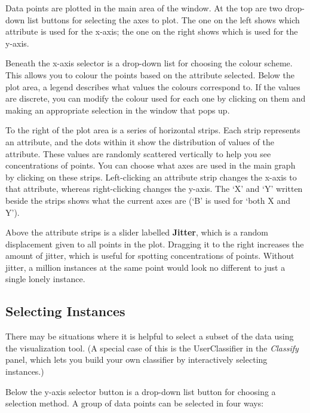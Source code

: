 \documentclass[a4paper]{article}
\begin{document}
Data points are plotted in the main area of the window.  At the top
are two drop-down list buttons for selecting the axes to plot.  The
one on the left shows which attribute is used for the x-axis; the one
on the right shows which is used for the y-axis.

Beneath the x-axis selector is a drop-down list for choosing the
colour scheme.  This allows you to colour the points based on the
attribute selected.  Below the plot area, a legend describes what
values the colours correspond to. If the values are discrete, you can
modify the colour used for each one by clicking on them and making an
appropriate selection in the window that pops up.

To the right of the plot area is a series of horizontal strips. Each
strip represents an attribute, and the dots within it show the
distribution of values of the attribute.  These values are randomly
scattered vertically to help you see concentrations of points.  You
can choose what axes are used in the main graph by clicking on these
strips.  Left-clicking an attribute strip changes the x-axis to that
attribute, whereas right-clicking changes the y-axis. The `X' and `Y'
written beside the strips shows what the current axes are (`B' is used
for `both X and Y').

Above the attribute strips is a slider labelled \textbf{Jitter}, which
is a random displacement given to all points in the plot.  Dragging it
to the right increases the amount of jitter, which is useful for
spotting concentrations of points. Without jitter, a million instances
at the same point would look no different to just a single lonely
instance.

\subsection{Selecting Instances}

There may be situations where it is helpful to select a subset of the
data using the visualization tool. (A special case of this is the
UserClassifier in the {\em Classify} panel, which lets you build your
own classifier by interactively selecting instances.)

Below the y-axis selector button is a drop-down list button for choosing a
selection method.  A group of data points can be selected in four ways:
\end{document}
